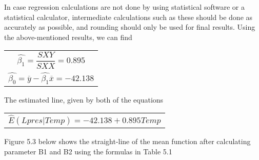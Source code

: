 \documentclass{article}
\begin{document}
    In case regression calculations are not done by using statistical software or a statistical calculator, intermediate calculations such as these should be done as accurately as possible, and rounding should only be used for final results. Using the above-mentioned results, we can find
    
    \begin{center}
        \begin{tabular}{c}
        ${\hat{\beta_{1}} = \dfrac{SXY}{SXX} = 0.895}$ \\
        ${\hat{\beta_{0}} = \overline{y} - \hat{\beta_{1}} \overline{x} = -42.138}$
        \end{tabular} 
    \end{center}
    
    The estimated line, given by both of the equations

    \begin{center}
        \begin{tabular}{c}
            ${\hat{E} (Lpres|Temp) = -42.138 + 0.895Temp}$ \\
        \end{tabular} 
    \end{center}
    
    Figure 5.3 below shows the straight-line of the mean function after calculating parameter B1 and B2 using the formulas in Table 5.1
    
    \begin{center}
    \end{center}
\end{document}
